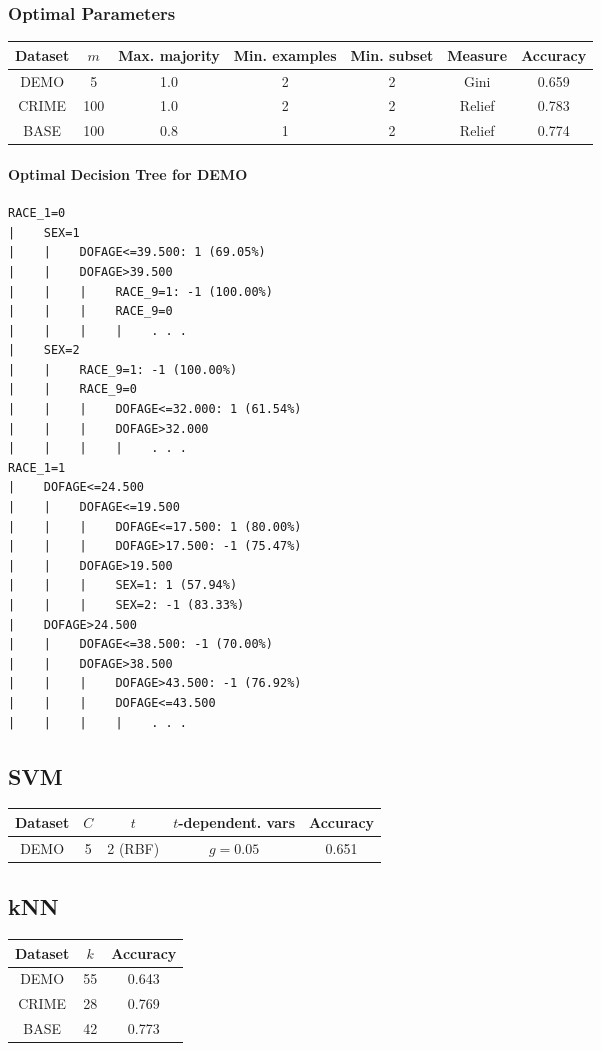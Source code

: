 \documentclass[]{article}
\begin{document}
\subsubsection{Optimal Parameters}

\begin{tabular}{|c|c|c|c|c|c|c|}
\hline
Dataset & $m$ & Max. majority & Min. examples & Min. subset & Measure & Accuracy \\
\hline
DEMO & 5 & 1.0 & 2 & 2 & Gini & 0.659 \\
CRIME & 100 & 1.0 & 2 & 2 & Relief & 0.783 \\
BASE & 100 & 0.8 & 1 & 2 & Relief & 0.774 \\
\hline
\end{tabular}

\paragraph{Optimal Decision Tree for DEMO} %
\begin{verbatim}
RACE_1=0
|    SEX=1
|    |    DOFAGE<=39.500: 1 (69.05%)
|    |    DOFAGE>39.500
|    |    |    RACE_9=1: -1 (100.00%)
|    |    |    RACE_9=0
|    |    |    |    . . .
|    SEX=2
|    |    RACE_9=1: -1 (100.00%)
|    |    RACE_9=0
|    |    |    DOFAGE<=32.000: 1 (61.54%)
|    |    |    DOFAGE>32.000
|    |    |    |    . . .
RACE_1=1
|    DOFAGE<=24.500
|    |    DOFAGE<=19.500
|    |    |    DOFAGE<=17.500: 1 (80.00%)
|    |    |    DOFAGE>17.500: -1 (75.47%)
|    |    DOFAGE>19.500
|    |    |    SEX=1: 1 (57.94%)
|    |    |    SEX=2: -1 (83.33%)
|    DOFAGE>24.500
|    |    DOFAGE<=38.500: -1 (70.00%)
|    |    DOFAGE>38.500
|    |    |    DOFAGE>43.500: -1 (76.92%)
|    |    |    DOFAGE<=43.500
|    |    |    |    . . .
\end{verbatim}

\subsection{SVM}
\begin{tabular}{|c|c|c|c|c|}
\hline
Dataset & $C$ & $t$ & $t$-dependent. vars & Accuracy \\
\hline
DEMO & 5 & 2 (RBF) & $g=0.05$ & 0.651 \\
\hline
\end{tabular}

\subsection{kNN}
\begin{tabular}{|c|c|c|}
\hline
Dataset & $k$ & Accuracy \\
\hline
DEMO & 55 & 0.643 \\
CRIME & 28 & 0.769 \\
BASE & 42 & 0.773 \\
\hline
\end{tabular}
\end{document}
